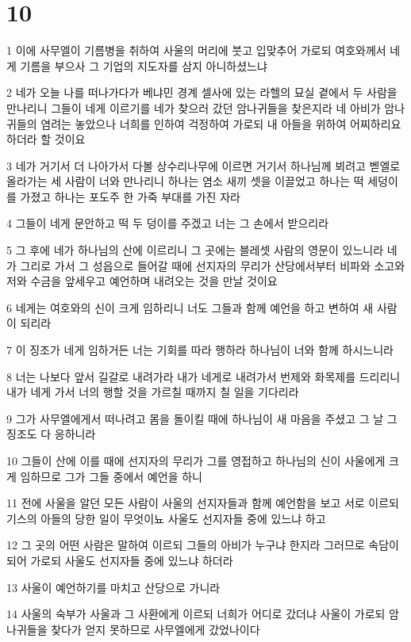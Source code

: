\chapter{10}

\par 1 이에 사무엘이 기름병을 취하여 사울의 머리에 붓고 입맞추어 가로되 여호와께서 네게 기름을 부으사 그 기업의 지도자를 삼지 아니하셨느냐
\par 2 네가 오늘 나를 떠나가다가 베냐민 경계 셀사에 있는 라헬의 묘실 곁에서 두 사람을 만나리니 그들이 네게 이르기를 네가 찾으러 갔던 암나귀들을 찾은지라 네 아비가 암나귀들의 염려는 놓았으나 너희를 인하여 걱정하여 가로되 내 아들을 위하여 어찌하리요 하더라 할 것이요
\par 3 네가 거기서 더 나아가서 다볼 상수리나무에 이르면 거기서 하나님께 뵈려고 벧엘로 올라가는 세 사람이 너와 만나리니 하나는 염소 새끼 셋을 이끌었고 하나는 떡 세덩이를 가졌고 하나는 포도주 한 가죽 부대를 가진 자라
\par 4 그들이 네게 문안하고 떡 두 덩이를 주겠고 너는 그 손에서 받으리라
\par 5 그 후에 네가 하나님의 산에 이르리니 그 곳에는 블레셋 사람의 영문이 있느니라 네가 그리로 가서 그 성읍으로 들어갈 때에 선지자의 무리가 산당에서부터 비파와 소고와 저와 수금을 앞세우고 예언하며 내려오는 것을 만날 것이요
\par 6 네게는 여호와의 신이 크게 임하리니 너도 그들과 함께 예언을 하고 변하여 새 사람이 되리라
\par 7 이 징조가 네게 임하거든 너는 기회를 따라 행하라 하나님이 너와 함께 하시느니라
\par 8 너는 나보다 앞서 길갈로 내려가라 내가 네게로 내려가서 번제와 화목제를 드리리니 내가 네게 가서 너의 행할 것을 가르칠 때까지 칠 일을 기다리라
\par 9 그가 사무엘에게서 떠나려고 몸을 돌이킬 때에 하나님이 새 마음을 주셨고 그 날 그 징조도 다 응하니라
\par 10 그들이 산에 이를 때에 선지자의 무리가 그를 영접하고 하나님의 신이 사울에게 크게 임하므로 그가 그들 중에서 예언을 하니
\par 11 전에 사울을 알던 모든 사람이 사울의 선지자들과 함께 예언함을 보고 서로 이르되 기스의 아들의 당한 일이 무엇이뇨 사울도 선지자들 중에 있느냐 하고
\par 12 그 곳의 어떤 사람은 말하여 이르되 그들의 아비가 누구냐 한지라 그러므로 속담이 되어 가로되 사울도 선지자들 중에 있느냐 하더라
\par 13 사울이 예언하기를 마치고 산당으로 가니라
\par 14 사울의 숙부가 사울과 그 사환에게 이르되 너희가 어디로 갔더냐 사울이 가로되 암나귀들을 찾다가 얻지 못하므로 사무엘에게 갔었나이다
